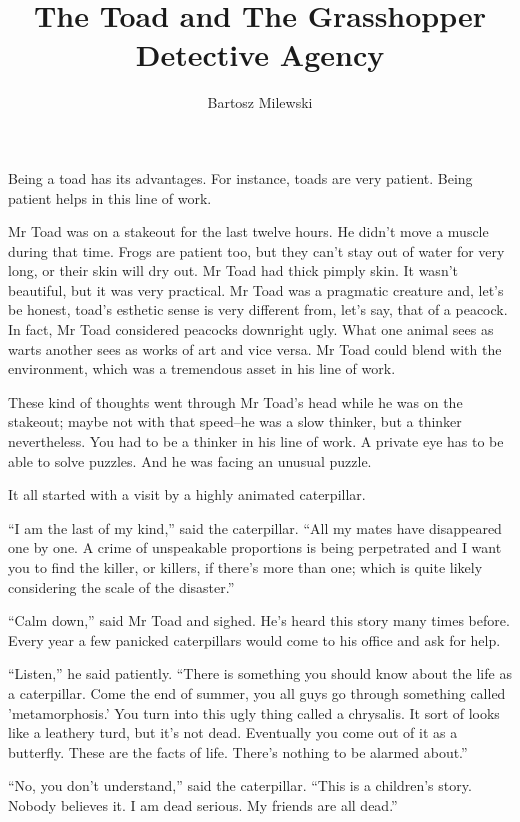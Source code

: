 \documentclass{memoir}
\author{Bartosz Milewski}
\title{The Toad and The Grasshopper Detective Agency}
\date{}
\begin{document}
\maketitle{}



Being a toad has its advantages. For instance, toads are very patient. Being patient helps in this line of work. 

Mr Toad was on a stakeout for the last twelve hours. He didn't move a muscle during that time. Frogs are patient too, but they can't stay out of water for very long, or their skin will dry out. Mr Toad had thick pimply skin. It wasn't beautiful, but it was very practical. Mr Toad was a pragmatic creature and, let's be honest, toad's esthetic sense is very different from, let's say, that of a peacock. In fact, Mr Toad considered peacocks downright ugly. What one animal sees as warts another sees as works of art and vice versa. Mr Toad could blend with the environment, which was a tremendous asset in his line of work.

These kind of thoughts went through Mr Toad's head while he was on the stakeout; maybe not with that speed--he was a slow thinker, but a thinker nevertheless. You had to be a thinker in his line of work. A private eye has to be able to solve puzzles. And he was facing an unusual puzzle. 

It all started with a visit by a highly animated caterpillar. 

``I am the last of my kind,'' said the caterpillar. ``All my mates have disappeared one by one. A crime of unspeakable proportions is being perpetrated and I want you to find the killer, or killers, if there's more than one; which is quite likely considering the scale of the disaster.''

``Calm down,'' said Mr Toad and sighed. He's heard this story many times before. Every year a few panicked caterpillars would come to his office and ask for help.

``Listen,'' he said patiently. ``There is something you should know about the life as a caterpillar. Come the end of summer, you all guys go through something called 'metamorphosis.' You turn into this ugly thing called a chrysalis. It sort of looks like a leathery turd, but it's not dead. Eventually you come out of it as a butterfly. These are the facts of life. There's nothing to be alarmed about.''

``No, you don't understand,'' said the caterpillar. ``This is a children's story. Nobody believes it. I am dead serious. My friends are all dead.''
\end{document}
